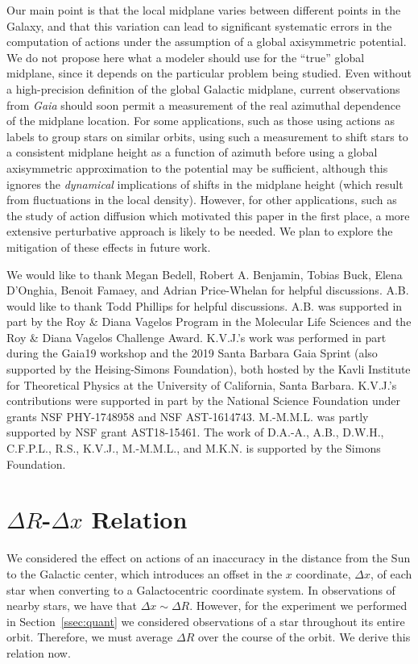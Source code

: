 \documentclass[twocolumn]{aastex62}
\begin{document}
Our main point is that the local midplane varies between different points in
the Galaxy, and that this variation can lead to significant systematic errors
in the computation of actions under the assumption of a global axisymmetric
potential. We do not propose here what a modeler should use for the ``true''
global midplane, since it depends on the particular problem being studied.
Even without a high-precision definition of the global Galactic midplane,
current observations from {\em Gaia} should soon permit a measurement of the
real azimuthal dependence of the midplane location. For some applications,
such as those using actions as labels to group stars on similar orbits, using
such a measurement to shift stars to a consistent midplane height as a
function of azimuth before using a global axisymmetric approximation to the
potential may be sufficient, although this ignores the \emph{dynamical}
implications of shifts in the midplane height (which result from fluctuations
in the local density). However, for other applications, such as the study of
action diffusion which motivated this paper in the first place, a more
extensive perturbative approach is likely to be needed. We plan to explore the
mitigation of these effects in future work.

\acknowledgments
We would like to thank Megan Bedell, Robert A. Benjamin, Tobias Buck, Elena
D'Onghia, Benoit Famaey, and Adrian Price-Whelan for helpful discussions. A.B.
would like to thank Todd Phillips for helpful discussions. A.B. was supported
in part by the Roy \& Diana Vagelos Program in the Molecular Life Sciences and
the Roy \& Diana Vagelos Challenge Award. K.V.J.'s work was performed in part
during the Gaia19 workshop and the 2019 Santa Barbara Gaia Sprint (also
supported by the Heising-Simons Foundation), both hosted by the Kavli
Institute for Theoretical Physics at the University of California, Santa
Barbara. K.V.J.'s contributions were supported in part by the National Science
Foundation under grants NSF PHY-1748958 and NSF AST-1614743. M.-M.M.L. was
partly supported by NSF grant AST18-15461. The work of D.A.-A., A.B., D.W.H.,
C.F.P.L., R.S., K.V.J., M.-M.M.L., and M.K.N. is supported by the Simons
Foundation.

\appendix
\section{$\Delta R$-$\Delta x$ Relation} \label{app:deltax}
We considered the effect on actions of an inaccuracy in the distance from the
Sun to the Galactic center, which introduces an offset in the $x$ coordinate,
$\Delta x$, of each star when converting to a Galactocentric coordinate
system. In observations of nearby stars, we have that $\Delta x \sim \Delta
R$. However, for the experiment we performed in Section~\ref{ssec:quant} we
considered observations of a star throughout its entire orbit. Therefore, we
must average $\Delta R$ over the course of the orbit. We derive this relation
now.
\end{document}
